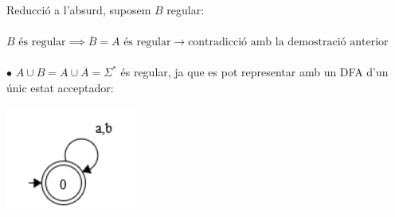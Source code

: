 \documentclass{article}
\begin{document}
Reducció a l'absurd, suposem $B$ regular:\\
\\
$B \text{ és regular} \implies \overline{B} = A \text{ és regular} \rightarrow \text{contradicció amb la demostració anterior}$\\
\\
$\bullet$ $A\cup B = A \cup \overline A = \Sigma^*$ és regular, ja que es pot representar amb un DFA d'un únic estat acceptador:

\begin{center} 
\includegraphics{DFA.png} 
\end{center} 
\end{document}
